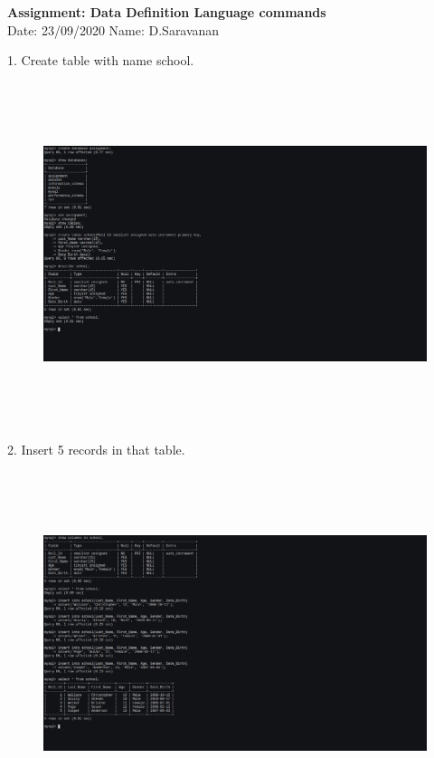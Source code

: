 \documentclass[a4paper,11pt,openright]{report}
\begin{document}
\singlespacing
\pagestyle{plain}

\begin{center}
\textbf{Assignment: Data Definition Language commands} \\
Date: 23/09/2020 \hspace{2mm} Name: D.Saravanan
\end{center}

\vspace{10px}

1. Create table with name school.

\begin{figure}[ht!]
\includegraphics[width=20cm,height=10cm,keepaspectratio]{solution1.png}
\centering
\end{figure}

\vspace{20px}

2. Insert 5 records in that table.

\begin{figure}[ht!]
\includegraphics[width=20cm,height=10cm,keepaspectratio]{solution2.png}
\centering
\end{figure}
\end{document}
